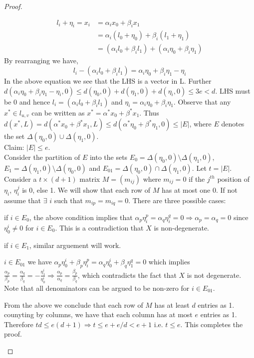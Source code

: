 \begin{proof}
\begin{itemize}
\begin{align*}
 			l_i+\eta_i= x_i &= \alpha_i x_0+\beta_i x_1\\
 			&= \alpha_i(l_0+\eta_0)+\beta_i(l_1+\eta_1)\\
 			&= (\alpha_i l_0+\beta_i l_1)+ (\alpha_i \eta_0+\beta_i \eta_1)
 		\end{align*}
 		By rearranging we have, 
 		$$l_i-(\alpha_i l_0 +\beta_i l_1)= \alpha_i \eta_0 + \beta_i \eta_1 - \eta_i$$
 		In the above equation we see that the LHS is a vector in L. Further $d(\alpha_i \eta_0 + \beta_i \eta_1 - \eta_i, 0)\leq d(\eta_0,0)+ d(\eta_1,0) + d(\eta_i,0)\leq 3e < d$. LHS must be 0 and hence $l_i = (\alpha_i l_0 +\beta_i l_1)$ and $\eta_i= \alpha_i \eta_0+\beta_i \eta_1$. Observe that any $x^*\in l_{u,v}$ can be written as $x^*=\alpha^* x_0+ \beta^* x_1$. Thus $d(x^*,L) = d(\alpha^* x_0+ \beta^* x_1, L)\leq d(\alpha^* \eta_0+ \beta^* \eta_1,0) \leq |E|$, where $E$ denotes the set $\Delta(\eta_0,0)\cup \Delta(\eta_1,0)$.\\
 		Claim: $|E|\leq e$.\\ 
 		Consider the partition of $E$ into the sets $E_0= \Delta(\eta_0,0) \setminus \Delta(\eta_1,0)$, $E_1= \Delta(\eta_1,0) \setminus \Delta(\eta_0,0)$ and $E_{01}= \Delta(\eta_0,0) \cap \Delta(\eta_1,0)$.
		Let $t=|E|$. Consider a $t\times (d+1)$ matrix $M=(m_{ij})$ where $m_{ij}=0$ if the $j^{th}$ position of $\eta_i$, $\eta_i^j$ is 0, else 1. We will show that each row of $M$ has at most one 0. If not assume that $\exists$ $i$ such that $m_{ip}=m_{iq}=0$. There are three possible cases:
	From the above we conclude that each row of $M$ has at least $d$ entries as 1. counyting by columns, we have that each column has at most $e$ entries as 1. Therefore $td\leq e(d+1) \Rightarrow t\leq e+e/d< e+1$ i.e. $t\leq e$. This completes the proof.
 	\end{itemize}
 \end{proof}

